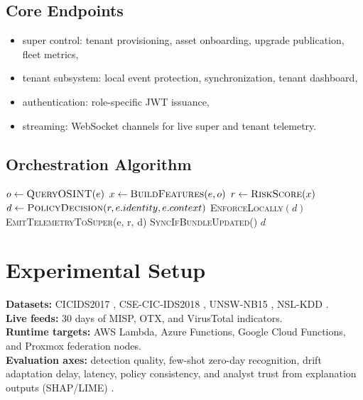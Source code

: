 \documentclass[conference]{IEEEtran}
\begin{document}
\subsection{Core Endpoints}
\begin{itemize}
  \item super control: tenant provisioning, asset onboarding, upgrade publication, fleet metrics,
  \item tenant subsystem: local event protection, synchronization, tenant dashboard,
  \item authentication: role-specific JWT issuance,
  \item streaming: WebSocket channels for live super and tenant telemetry.
\end{itemize}

\subsection{Orchestration Algorithm}
\begin{algorithm}[t]
\caption{Tenant-Local Protection with Federated Super Synchronization}
\begin{algorithmic}[1]
  \State $o \gets \textsc{QueryOSINT}(e)$
  \State $x \gets \textsc{BuildFeatures}(e, o)$
  \State $r \gets \textsc{RiskScore}(x)$
  \State $d \gets \textsc{PolicyDecision}(r, e.identity, e.context)$
  \State \textsc{EnforceLocally}$(d)$
  \State \textsc{EmitTelemetryToSuper}(e, r, d)
  \State \textsc{SyncIfBundleUpdated}()
  \State \Return $d$
\EndProcedure
\end{algorithmic}
\end{algorithm}

\section{Experimental Setup}
\textbf{Datasets:} CICIDS2017 \cite{sharafaldin2018cicids2017}, CSE-CIC-IDS2018 \cite{cse2018dataset}, UNSW-NB15 \cite{moustafa2015unsw}, NSL-KDD \cite{tavallaee2009nslkdd}.\\
\textbf{Live feeds:} 30 days of MISP, OTX, and VirusTotal indicators.\\
\textbf{Runtime targets:} AWS Lambda, Azure Functions, Google Cloud Functions, and Proxmox federation nodes.\\
\textbf{Evaluation axes:} detection quality, few-shot zero-day recognition, drift adaptation delay, latency, policy consistency, and analyst trust from explanation outputs (SHAP/LIME) \cite{lundberg2017shap,ribeiro2016lime}.
\end{document}
